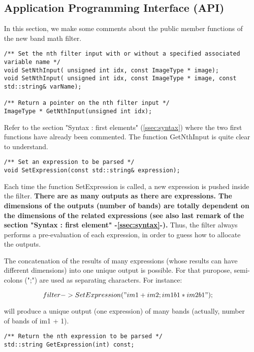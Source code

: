 \subsection{Application Programming Interface (API)}\label{ssec:API}

In this section, we make some comments about the public member functions of the new band math filter.

\begin{verbatim}
/** Set the nth filter input with or without a specified associated variable name */
void SetNthInput( unsigned int idx, const ImageType * image);
void SetNthInput( unsigned int idx, const ImageType * image, const std::string& varName);

/** Return a pointer on the nth filter input */
ImageType * GetNthInput(unsigned int idx);
\end{verbatim}

Refer to the section "Syntax : first elements" (\ref{ssec:syntax}) 
where the two first functions have already been commented. 
The function GetNthInput is quite clear to understand.

\begin{verbatim}
/** Set an expression to be parsed */
void SetExpression(const std::string& expression);
\end{verbatim}

Each time the function  SetExpression is called, a new expression is 
pushed inside the filter. \textbf{There are as many outputs as there 
are expressions. The dimensions of the outputs (number of bands) are 
totally dependent on the dimensions of the related expressions (see 
also last remark of the section "Syntax : first element" -\ref{ssec:syntax}-).} 
Thus, the filter always performs a pre-evaluation of each expression, 
in order to guess how to allocate the outputs.

The concatenation of the results of many expressions (whose results 
can have different dimensions) into one unique output is possible. 
For that puropose, semi-colons (";") are used as separating characters. 
For instance:

\begin{equation}
	filter->SetExpression("im1 + im2 ; im1b1*im2b1");
\end{equation}

will produce a unique output (one expression) of many bands (actually, 
number of bands of im1 + 1).

\begin{verbatim}
/** Return the nth expression to be parsed */
std::string GetExpression(int) const;
\end{verbatim}

